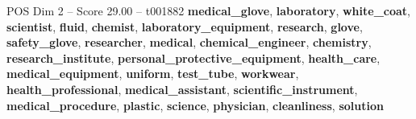 \begin{textsample}{POS Dim 2 – Score 29.00 – t001882}  \label{ex:f2_pos_021}
\textbf{medical\_glove}, \textbf{laboratory}, \textbf{white\_coat}, \textbf{scientist}, \textbf{fluid}, \textbf{chemist}, \textbf{laboratory\_equipment}, \textbf{research}, \textbf{glove}, \textbf{safety\_glove}, \textbf{researcher}, \textbf{medical}, \textbf{chemical\_engineer}, \textbf{chemistry}, \textbf{research\_institute}, \textbf{personal\_protective\_equipment}, \textbf{health\_care}, \textbf{medical\_equipment}, \textbf{uniform}, \textbf{test\_tube}, \textbf{workwear}, \textbf{health\_professional}, \textbf{medical\_assistant}, \textbf{scientific\_instrument}, \textbf{medical\_procedure}, \textbf{plastic}, \textbf{science}, \textbf{physician}, \textbf{cleanliness}, \textbf{solution}

\end{textsample}
